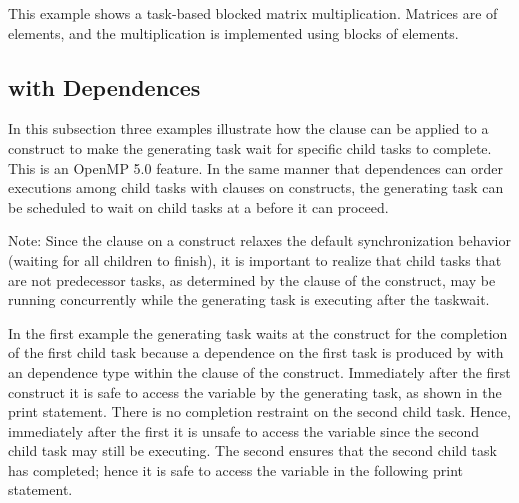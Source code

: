 This example shows a task-based blocked matrix multiplication. Matrices are of 
 elements, and the multiplication is implemented using blocks
of  elements.



\subsection{ with Dependences}
\label{subsec:taskwait_depend}

In this subsection three examples illustrate how the
 clause can be applied to a  construct to make the
generating task wait for specific child tasks to complete. This is an OpenMP 5.0 feature.
 In the same manner that
dependences can order executions among child tasks with  clauses on
 constructs, the generating task can be scheduled to wait on child tasks
at a  before it can proceed.

Note: Since the  clause on a  construct relaxes the
default synchronization behavior (waiting for all children to finish), it is important to
realize that child tasks that are not predecessor tasks, as determined by the 
clause of the  construct, may be running concurrently while the
generating task is executing after the taskwait.

In the first example the generating task waits at the  construct
for the completion of the first child task because a dependence on the first task
is produced by  with an  dependence type within the 
clause of the  construct.
Immediately after the first  construct it is safe to access the
 variable by the generating task, as shown in the print statement.
There is no completion restraint on the second child task.
Hence, immediately after the first  it is unsafe to access the
 variable since the second child task may still be executing.
The second  ensures that the second child task has completed; hence
it is safe to access the  variable in the following print statement.

